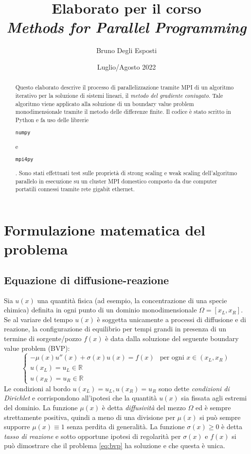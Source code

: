 \documentclass[a4paper,11pt]{article}
\title{\Huge{\bf{
	Elaborato per il corso \\
	\emph{Methods for Parallel Programming}
}}}
\author{\huge{Bruno Degli Esposti}}
\date{\Large{Luglio/Agosto 2022}}
\newcommand{\R}{\mathbb{R}}
\newcommand{\code}[1]{\begin{small}\texttt{#1}\end{small}}
\begin{document}
\maketitle

\begin{abstract}
Questo elaborato descrive il processo di parallelizzazione
tramite MPI di un algoritmo iterativo per la soluzione di
sistemi lineari, il \emph{metodo del gradiente coniugato}.
Tale algoritmo viene applicato alla soluzione di un
boundary value problem monodimensionale tramite il metodo
delle differenze finite. Il codice è stato scritto in Python
e fa uso delle librerie \code{numpy} e \code{mpi4py}.
Sono stati effettuati test sulle proprietà di strong scaling
e weak scaling dell'algoritmo parallelo in esecuzione su
un cluster MPI domestico composto da due computer portatili
connessi tramite rete gigabit ethernet.
\end{abstract}

\section{Formulazione matematica del problema}
\subsection*{Equazione di diffusione-reazione}
Sia $u(x)$ una quantità fisica (ad esempio, la concentrazione
di una specie chimica) definita in ogni punto di un dominio
monodimensionale $\Omega = [x_L,x_R]$. Se al variare del tempo
$u(x)$ è soggetta unicamente a processi di diffusione e di
reazione, la configurazione di equilibrio per tempi grandi
in presenza di un termine di sorgente/pozzo $f(x)$ è data
dalla soluzione del seguente boundary value problem (BVP):
\begin{equation} \label{eq:bvp}
\begin{cases}
-\mu(x) u''(x) + \sigma(x) u(x) = f(x)
& \text{per ogni $x \in (x_L,x_R)$} \\
u(x_L) = u_L \in \R \\
u(x_R) = u_R \in \R
\end{cases}
\end{equation}
Le condizioni al bordo $u(x_L) = u_L, u(x_R) = u_R$ sono dette
\emph{condizioni di Dirichlet} e corrispondono all'ipotesi che
la quantità $u(x)$ sia fissata agli estremi del dominio.
La funzione $\mu(x)$ è detta \emph{diffusività} del mezzo $\Omega$
ed è sempre strettamente positiva, quindi a meno di una divisione
per $\mu(x)$ si può sempre supporre $\mu(x) \equiv 1$ senza perdita di generalità.
La funzione $\sigma(x) \geq 0$ è detta \emph{tasso di reazione} e sotto
opportune ipotesi di regolarità per $\sigma(x)$ e $f(x)$ si può dimostrare
che il problema \eqref{eq:bvp} ha soluzione e che questa è unica.
\end{document}
